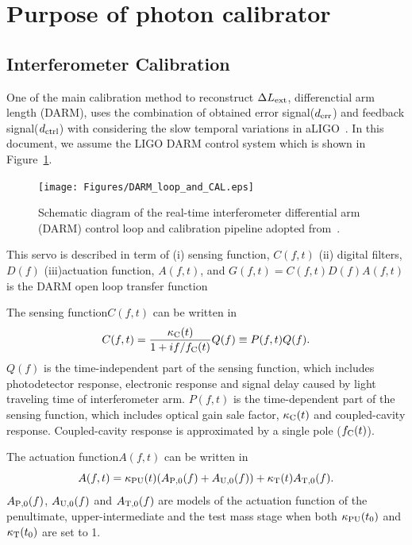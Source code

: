 \section{Purpose of photon calibrator}
\subsection{Interferometer Calibration}\label{sec:darm_calib}

One of the main calibration method to reconstruct $\Delta L_{\rm ext}$, differenctial arm length (DARM), 
uses the combination of obtained error signal($d_{\rm err}$) and feedback signal($d_{\rm ctrl}$) 
with considering the slow temporal variations in 
aLIGO~\cite{LIGO-CAL,Tuyenbayev}.
In this document, we assume the LIGO DARM control system which is shown in Figure~\ref{fig:L_DARM_control_loop}.
\begin{figure}
\begin{center}
\texttt{[image: Figures/DARM\_loop\_and\_CAL.eps]}
\caption{Schematic diagram of the real-time interferometer differential 
arm (DARM) control loop and calibration pipeline adopted 
from~\cite{LIGO-CAL,Tuyenbayev}.}
\label{fig:L_DARM_control_loop} 
\end{center}
\end{figure}
This servo is described in term of 
(i) sensing function, $C(f,t)$ 
(ii) digital filters, $D(f)$ 
(iii)actuation function, $A(f,t)$, 
and $G(f,t) = C(f,t)D(f)A(f,t)$ is the DARM open loop transfer function  

The sensing function$C(f,t)$ can be written in
\begin{equation}
C(f,t) = \frac{\kappa_{\rm C}(t)}{1+if/f_{\rm C}(t)}Q(f) \equiv P(f,t) Q(f).
\end{equation}
$Q(f)$ is the time-independent part of the sensing function, which includes
photodetector response,
electronic response
and signal delay caused by light traveling time of interferometer arm.
$P(f,t)$ is the time-dependent part of the sensing function, which includes
optical gain sale factor, $\kappa_{\rm C}(t)$ and coupled-cavity response.
Coupled-cavity response is approximated by a single pole ($f_{\rm C}(t)$).

The actuation function$A(f,t)$ can be written in
\begin{equation}
A(f,t) = \kappa_{\rm PU}(t)(A_{\rm P,0}(f)+A_{\rm U,0}(f)) + \kappa_{\rm T}(t) A_{\rm T,0}(f).
\end{equation}
$A_{\rm P,0}(f)$, $A_{\rm U,0}(f)$ and $A_{\rm T,0}(f)$ are models of the actuation function 
of the penultimate, upper-intermediate and the test mass stage 
when both $\kappa_{\rm PU}(t_0)$ and $\kappa_{\rm T}(t_0)$ are set to 1.

